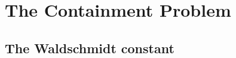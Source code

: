 \documentclass[]{article}
\theoremstyle{plain}
\theoremstyle{remark}
\theoremstyle{definition}
\begin{document}
\section{The Containment Problem}

\subsection{The Waldschmidt constant}

\newpage
\printbibliography
\end{document}

